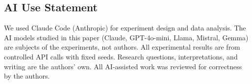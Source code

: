 \documentclass{article} %
\begin{document}
\subsection*{AI Use Statement}
We used Claude Code (Anthropic) for experiment design and data analysis. The AI models studied in this paper (Claude, GPT-4o-mini, Llama, Mistral, Gemma) are subjects of the experiments, not authors. All experimental results are from controlled API calls with fixed seeds. Research questions, interpretations, and writing are the authors' own. All AI-assisted work was reviewed for correctness by the authors.




\appendix


\end{document}
